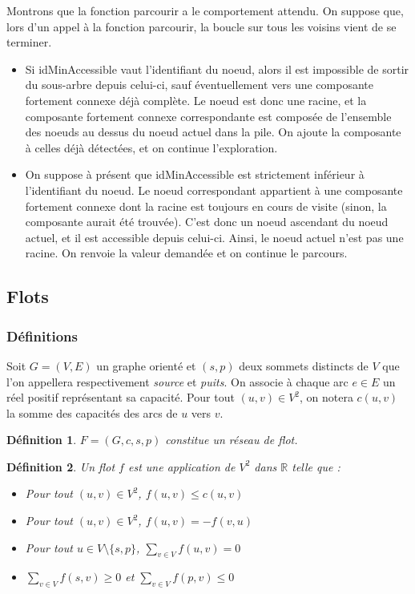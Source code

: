 \documentclass[11pt,a4paper]{article}
\newtheorem{definition}{Définition}
\begin{document}
Montrons que la fonction parcourir a le comportement attendu. On suppose que, lors d'un appel à la fonction parcourir, la boucle sur tous les voisins vient de se terminer.
\begin{itemize}
  \item Si idMinAccessible vaut l'identifiant du noeud, alors il est impossible de sortir du sous-arbre depuis celui-ci, sauf éventuellement vers une composante fortement connexe déjà complète. Le noeud est donc une racine, et la composante fortement connexe correspondante est composée de l'ensemble des noeuds au dessus du noeud actuel dans la pile. On ajoute la composante à celles déjà détectées, et on continue l'exploration.
  \item On suppose à présent que idMinAccessible est strictement inférieur à l'identifiant du noeud. Le noeud correspondant appartient à une composante fortement connexe dont la racine est toujours en cours de visite (sinon, la composante aurait été trouvée). C'est donc un noeud ascendant du noeud actuel, et il est accessible depuis celui-ci. Ainsi, le noeud actuel n'est pas une racine. On renvoie la valeur demandée et on continue le parcours.
\end{itemize}


  \subsection{Flots}
    \subsubsection{Définitions}

Soit \(G=(V,E)\) un graphe orienté et \((s,p)\) deux sommets distincts de \(V\) que l'on appellera respectivement \textit{source} et \textit{puits}. On associe à chaque arc \(e \in E\) un réel positif représentant sa capacité. Pour tout \((u,v) \in V^2\), on notera \(c(u,v)\) la somme des capacités des arcs de \(u\) vers \(v\).

\begin{definition}
  \(F = (G,c,s,p)\) constitue un réseau de flot.
\end{definition}

\begin{definition}
  Un flot \(f\) est une application de \(V^2\) dans \(\mathbb{R}\) telle que :
  \begin{itemize}
    \item Pour tout \((u,v) \in V^2\), \(f(u,v) \leq c(u,v)\)
    \item Pour tout \((u,v) \in V^2\), \(f(u,v) = -f(v,u)\)
    \item Pour tout \(u \in V \setminus \{s,p\}\), \(\sum\limits_{v \in V} f(u,v) = 0\)
    \item \(\sum\limits_{v \in V} f(s,v) \geq 0\) et \(\sum\limits_{v \in V} f(p,v) \leq 0\)
  \end{itemize}
\end{definition}
\end{document}
